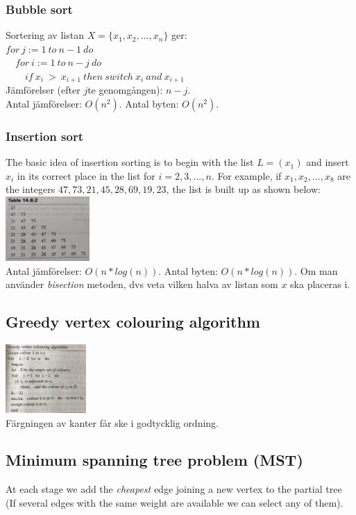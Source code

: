 \documentclass{article}
\begin{document}
\begin{multicols}{2}
\subsubsection{Bubble sort}
Sortering av listan $X = \{x_1,x_2,...,x_n\}$ ger:\\
$for \ j:=1 \ to \ n-1 \ do$\\
$\quad for \ i:=1 \ to \ n-j \ do$\\
$\quad \quad if \ x_i \ > \ x_{i+1} \ then \ switch \ x_i \ and \ x_{i+1}$\\
\newline
Jämförelser (efter $j$te genomgången): $n-j$.\\
Antal jämförelser: $O(n^2)$. Antal byten: $O(n^2)$. 

\subsubsection{Insertion sort}
The basic idea of insertion sorting is to begin with the list $L=(x_1)$ and insert $x_i$ in its correct place in the list for $i =2,3,...,n$. For example, if $x_1,x_2,...,x_8$ are the integers $47,73,21,45,28,69,19,23$, the list is built up as shown below:\\
\includegraphics[width=0.24\textwidth]{insertion}\\
Antal jämförelser: $O(n*log(n))$. Antal byten: $O(n*log(n))$. Om man använder \textit{bisection} metoden, dvs veta vilken halva av listan som $x$ ska placeras i.

\subsection{Greedy vertex colouring algorithm}
\includegraphics[width=0.23\textwidth]{color_alg}\\
Färgningen av kanter får ske i godtycklig ordning.

\subsection{Minimum spanning tree problem (MST)}
At each stage we add the \textit{cheapest} edge joining a new vertex to the partial tree (If several edges with the same weight are available we can select any of them).


\end{multicols}
\end{document}

